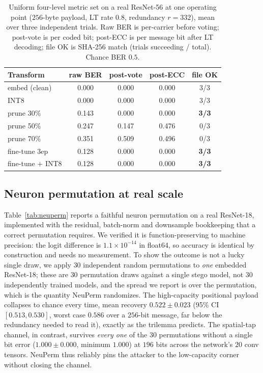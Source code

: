 \documentclass[10pt,journal]{IEEEtran}
\theoremstyle{remark}
\begin{document}
\begin{table}[!tb]\centering
\caption{Uniform four-level metric set on a real ResNet-56 at one operating point
($256$-byte payload, LT rate $0.8$, redundancy $r{=}332$), mean over three independent
trials. Raw BER is per-carrier before voting; post-vote is per coded bit; post-ECC is per
message bit after LT decoding; file OK is SHA-256 match (trials succeeding / total).
Chance BER $0.5$.}
\label{tab:uniform}
\begin{tabular*}{\columnwidth}{@{\extracolsep{\fill}}lcccc@{}}
\toprule
Transform & raw BER & post-vote & post-ECC & file OK\\
\midrule
embed (clean) & 0.000 & 0.000 & 0.000 & 3/3\\
INT8 & 0.000 & 0.000 & 0.000 & 3/3\\
prune 30\% & 0.143 & 0.000 & 0.000 & \textbf{3/3}\\
prune 50\% & 0.247 & 0.147 & 0.476 & 0/3\\
prune 70\% & 0.351 & 0.509 & 0.496 & 0/3\\
fine-tune 3ep & 0.128 & 0.000 & 0.000 & \textbf{3/3}\\
fine-tune $+$ INT8 & 0.128 & 0.000 & 0.000 & \textbf{3/3}\\
\bottomrule
\end{tabular*}
\end{table}

\subsection{Neuron permutation at real scale}
Table~\ref{tab:neuperm} reports a faithful neuron permutation on a real ResNet-18,
implemented with the residual, batch-norm and downsample bookkeeping that a correct
permutation requires. We verified it is function-preserving to machine precision: the
logit difference is $1.1\times10^{-14}$ in float64, so accuracy is identical by
construction and needs no measurement. To show the outcome is not a lucky single draw, we
apply $30$ independent random permutations to \emph{one} embedded ResNet-18; these are $30$
permutation draws against a single stego model, not $30$ independently trained models, and the
spread we report is over the permutation, which is the quantity NeuPerm randomizes. The high-capacity
positional payload collapses to chance every time, mean recovery $0.522\pm0.023$ (95\% CI
$[0.513,0.530]$, worst case $0.586$ over a $256$-bit message, far below the redundancy
needed to read it), exactly as the trilemma predicts. The spatial-tap channel, in contrast,
survives \emph{every one} of the $30$ permutations without a single bit error
($1.000\pm0.000$, minimum $1.000$) at $196$ bits across the network's $20$ conv tensors.
NeuPerm thus reliably pins the attacker to the low-capacity corner without closing the
channel.
\end{document}
